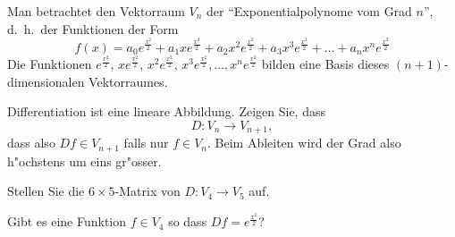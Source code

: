 Man betrachtet den Vektorraum $V_n$ der ``Exponentialpolynome vom Grad $n$'',
d.~h.~der Funktionen der Form
\[
f(x)=
a_0e^{\frac{x^2}2}
+a_1xe^{\frac{x^2}2}
+a_2x^2e^{\frac{x^2}2}
+a_3x^3e^{\frac{x^2}2}
+\dots
+a_nx^ne^{\frac{x^2}2}
\]
Die Funktionen
$e^{\frac{x^2}2}$,
$xe^{\frac{x^2}2}$,
$x^2e^{\frac{x^2}2}$,
$x^3e^{\frac{x^2}2},\dots,
x^ne^{\frac{x^2}2}$
bilden eine Basis dieses $(n+1)$-dimensionalen Vektorraumes.
\begin{teilaufgaben}
\item Differentiation
ist eine lineare Abbildung.
Zeigen Sie, dass
\[
D\colon V_n\to V_{n+1},
\]
dass also $Df\in V_{n+1}$ falls nur $f\in V_n$. Beim Ableiten wird der Grad
also h"ochstens um eins gr"osser.
\item Stellen Sie die $6\times 5$-Matrix von $D\colon V_4\to V_5$ auf.
\item Gibt es eine Funktion $f\in V_4$ so dass $Df=e^{\frac{x^2}2}$?
\end{teilaufgaben}

